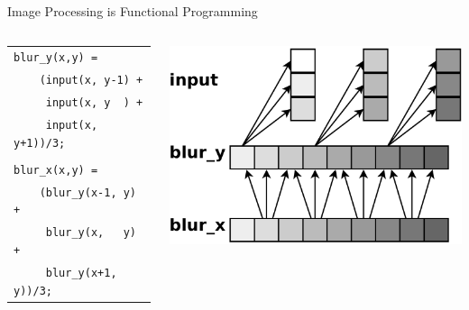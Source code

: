 \documentclass[xcolor=dvipsnames]{beamer}
\begin{document}
\begin{frame}{Image Processing is Functional Programming}
	\begin{columns}

	\begin{tabular}{l}
		\texttt{blur\_y(x,y) =} \\
		\texttt{~~~~(input(x, y-1) +}\\
		\texttt{~~~~~input(x, y~~) +}\\
		\texttt{~~~~~input(x, y+1))/3;}\\
		\\
		\texttt{blur\_x(x,y) =} \\
		\texttt{~~~~(blur\_y(x-1, y) +}\\
		\texttt{~~~~~blur\_y(x,~~~y) +}\\
		\texttt{~~~~~blur\_y(x+1, y))/3;}\\
	\end{tabular}

	\includegraphics[width=\textwidth]{blurx.pdf}
	\end{columns}
\end{frame}
\end{document}
